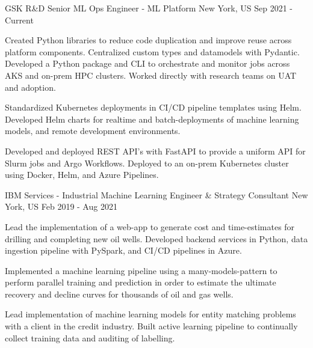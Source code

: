 \begin{cventries}
\cventrywide
  {GSK R\&D} %
  {Senior ML Ops Engineer - ML Platform} %
  {New York, US} %
  {Sep 2021 - Current} %
  {
    \begin{cvitems} %
      \item { Created Python libraries to reduce code duplication and improve reuse across platform components. Centralized custom types and datamodels with Pydantic. Developed a Python package and CLI to orchestrate and monitor jobs across AKS and on-prem HPC clusters. Worked directly with research teams on UAT and adoption. }
      \item { Standardized Kubernetes deployments in CI/CD pipeline templates using Helm. Developed Helm charts for realtime and batch-deployments of machine learning models, and remote development environments. }
      \item { Developed and deployed REST API's with FastAPI to provide a uniform API for Slurm jobs and Argo Workflows. Deployed to an on-prem Kubernetes cluster using Docker, Helm, and Azure Pipelines. }
    \end{cvitems}
  }
  \cventrywide
    {IBM Services - Industrial}  %
    {Machine Learning Engineer \& Strategy Consultant} %
    {New York, US} %
    {Feb 2019 - Aug 2021} %
    {
      \begin{cvitems} %
        \item {Lead the implementation of a web-app to generate cost and time-estimates for drilling and completing new oil wells. Developed backend services in Python, data ingestion pipeline with PySpark, and CI/CD pipelines in Azure.}
        \item {Implemented a machine learning pipeline using a many-models-pattern to perform parallel training and prediction in order to estimate the ultimate recovery and decline curves for thousands of oil and gas wells.}
        \item {Lead implementation of machine learning models for entity matching problems with a client in the credit industry. Built active learning pipeline to continually collect training data and auditing of labelling. }
      \end{cvitems}
    }


\end{cventries}

